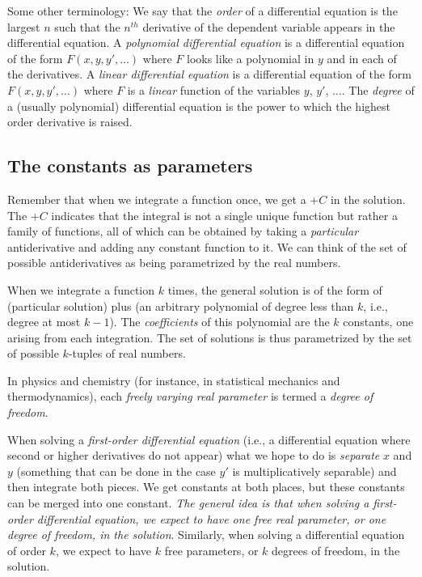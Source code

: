 \documentclass{amsart}
\begin{document}
Some other terminology: We say that the {\em order} of a differential
equation is the largest $n$ such that the $n^{th}$ derivative of the
dependent variable appears in the differential equation. A {\em
polynomial differential equation} is a differential equation of the
form $F(x,y,y',\dots)$ where $F$ looks like a polynomial in $y$ and in
each of the derivatives. A {\em linear differential equation} is a
differential equation of the form $F(x,y,y',\dots)$ where $F$ is a
{\em linear} function of the variables $y$, $y'$, $\dots$. The {\em
degree} of a (usually polynomial) differential equation is the power
to which the highest order derivative is raised.

\subsection{The constants as parameters}

Remember that when we integrate a function once, we get a $+C$ in the
solution. The $+C$ indicates that the integral is not a single unique
function but rather a family of functions, all of which can be
obtained by taking a {\em particular} antiderivative and adding any
constant function to it. We can think of the set of possible
antiderivatives as being parametrized by the real numbers.

When we integrate a function $k$ times, the general solution is of the
form of (particular solution) plus (an arbitrary polynomial of degree
less than $k$, i.e., degree at most $k - 1$). The {\em coefficients}
of this polynomial are the $k$ constants, one arising from each
integration. The set of solutions is thus parametrized by the set of
possible $k$-tuples of real numbers.

In physics and chemistry (for instance, in statistical mechanics and
thermodynamics), each {\em freely varying real parameter} is termed a
{\em degree of freedom}.

When solving a {\em first-order differential equation} (i.e., a
differential equation where second or higher derivatives do not
appear) what we hope to do is {\em separate} $x$ and $y$ (something
that can be done in the case $y'$ is multiplicatively separable) and
then integrate both pieces. We get constants at both places, but these
constants can be merged into one constant. {\em The general idea is
that when solving a first-order differential equation, we expect to
have one free real parameter, or one degree of freedom, in the
solution}. Similarly, when solving a differential equation of order
$k$, we expect to have $k$ free parameters, or $k$ degrees of freedom,
in the solution.
\end{document}
